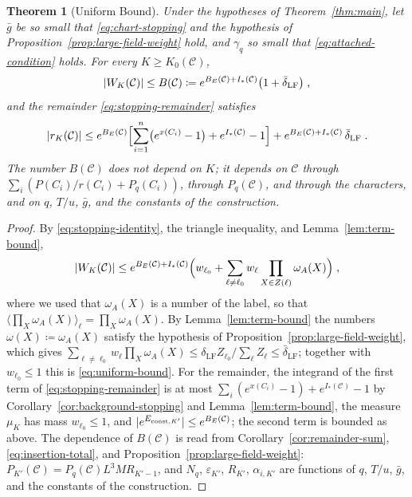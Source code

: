 \documentclass[11pt]{preprint}
\DeclarePairedDelimiter{\abs}{\lvert}{\rvert}
\numberwithin{equation}{section}
\newtheorem{theorem}{Theorem}[section]
\theoremstyle{definition}
\theoremstyle{remark}
\theoremstyle{plain}
\begin{document}
\begin{theorem}[Uniform Bound]\label{thm:uniform-bound}
Under the hypotheses of Theorem~\ref{thm:main}, let $\bar g$ be so small that \eqref{eq:chart-stopping} and the hypothesis of Proposition~\ref{prop:large-field-weight} hold, and $\gamma_q$ so small that \eqref{eq:attached-condition} holds. For every $K \geq K_0(\mathcal C)$,
\begin{equation}\label{eq:uniform-bound}
    \abs{W_K(\mathcal C)} \leq B(\mathcal C) \coloneqq e^{B_E(\mathcal C) + I_*(\mathcal C)}\bigl(1 + \bar\delta_{\mathrm{LF}}\bigr)\;,
\end{equation}
and the remainder \eqref{eq:stopping-remainder} satisfies
\begin{equation}\label{eq:remainder-bound}
    \abs{r_K(\mathcal C)} \leq e^{B_E(\mathcal C)}\Bigl[\sum_{i=1}^{n}\bigl(e^{x(C_i)} - 1\bigr) + e^{I_*(\mathcal C)} - 1\Bigr] + e^{B_E(\mathcal C) + I_*(\mathcal C)}\,\bar\delta_{\mathrm{LF}}\;.
\end{equation}
The number $B(\mathcal C)$ does not depend on $K$; it depends on $\mathcal C$ through $\sum_i(P(C_i)/r(C_i) + P_q(C_i))$, through $P_q(\mathcal C)$, and through the characters, and on $q$, $T/u$, $\bar g$, and the constants of the construction.
\end{theorem}

\begin{proof}
By \eqref{eq:stopping-identity}, the triangle inequality, and Lemma~\ref{lem:term-bound},
\begin{equation}\label{eq:uniform-bound-split}
    \abs{W_K(\mathcal C)} \leq e^{B_E(\mathcal C) + I_*(\mathcal C)}\Bigl(w_{\ell_0} + \sum_{\ell \neq \ell_0}w_\ell\prod_{X \in Z(\ell)}\omega_A(X)\Bigr)\;,
\end{equation}
where we used that $\omega_A(X)$ is a number of the label, so that $\langle\prod_X\omega_A(X)\rangle_\ell = \prod_X\omega_A(X)$. By Lemma~\ref{lem:term-bound} the numbers $\omega(X) \coloneqq \omega_A(X)$ satisfy the hypothesis of Proposition~\ref{prop:large-field-weight}, which gives $\sum_{\ell \neq \ell_0}w_\ell\prod_X\omega_A(X) \leq \delta_{\mathrm{LF}}Z_{\ell_0}/\sum_{\ell}Z_\ell \leq \bar\delta_{\mathrm{LF}}$; together with $w_{\ell_0} \leq 1$ this is \eqref{eq:uniform-bound}. For the remainder, the integrand of the first term of \eqref{eq:stopping-remainder} is at most $\sum_i(e^{x(C_i)} - 1) + e^{I_*(\mathcal C)} - 1$ by Corollary~\ref{cor:background-stopping} and Lemma~\ref{lem:term-bound}, the measure $\mu_K$ has mass $w_{\ell_0} \leq 1$, and $\abs{e^{E_{\mathrm{const},K'}}} \leq e^{B_E(\mathcal C)}$; the second term is bounded as above. The dependence of $B(\mathcal C)$ is read from Corollary~\ref{cor:remainder-sum}, \eqref{eq:insertion-total}, and Proposition~\ref{prop:large-field-weight}: $P_{K'}(\mathcal C) = P_q(\mathcal C)L^3MR_{K'-1}$, and $N_q$, $\varepsilon_{K'}$, $R_{K'}$, $\alpha_{i,K'}$ are functions of $q$, $T/u$, $\bar g$, and the constants of the construction.
\end{proof}
\end{document}
